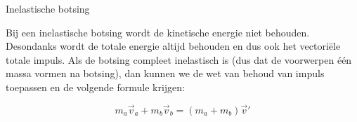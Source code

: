 \begin{app}{Inelastische botsing}
    
    Bij een inelastische botsing wordt de kinetische energie niet behouden. Desondanks wordt de totale energie altijd behouden en dus ook het vectoriële totale impuls. Als de botsing compleet inelastisch is (dus dat de voorwerpen één massa vormen na botsing), dan kunnen we de wet van behoud van impuls toepassen en de volgende formule krijgen:
    
    \begin{equation*}
        m_a\Vec{v}_a + m_b\Vec{v}_b = (m_a + m_b)\Vec{v}'
    \end{equation*}

\end{app}

